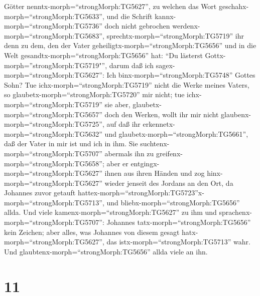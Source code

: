 Götter nenntx-morph=``strongMorph:TG5627'', zu welchen das Wort
geschahx-morph=``strongMorph:TG5633'', und die Schrift
kannx-morph=``strongMorph:TG5736'' doch nicht gebrochen
werdenx-morph=``strongMorph:TG5683'', 
sprechtx-morph=``strongMorph:TG5719'' ihr denn zu dem, den der Vater
geheiligtx-morph=``strongMorph:TG5656'' und in die Welt
gesandtx-morph=``strongMorph:TG5656'' hat: ``Du lästerst
Gottx-morph=''strongMorph:TG5719"'', darum daß ich
sagex-morph=``strongMorph:TG5627'': Ich
binx-morph=``strongMorph:TG5748'' Gottes Sohn?  Tue
ichx-morph=``strongMorph:TG5719'' nicht die Werke meines Vaters, so
glaubetx-morph=``strongMorph:TG5720'' mir nicht;  tue
ichx-morph=``strongMorph:TG5719'' sie aber,
glaubetx-morph=``strongMorph:TG5657'' doch den Werken, wollt ihr mir
nicht glaubenx-morph=``strongMorph:TG5725'', auf daß ihr
erkennetx-morph=``strongMorph:TG5632'' und
glaubetx-morph=``strongMorph:TG5661'', daß der Vater in mir ist und ich
in ihm.  Sie suchtenx-morph=``strongMorph:TG5707'' abermals
ihn zu greifenx-morph=``strongMorph:TG5658''; aber er
entgingx-morph=``strongMorph:TG5627'' ihnen aus ihren Händen
 und zog hinx-morph=``strongMorph:TG5627'' wieder jenseit
des Jordans an den Ort, da Johannes zuvor getauft
hattex-morph=``strongMorph:TG5723''x-morph=``strongMorph:TG5713'', und
bliebx-morph=``strongMorph:TG5656'' allda.  Und viele
kamenx-morph=``strongMorph:TG5627'' zu ihm und
sprachenx-morph=``strongMorph:TG5707'': Johannes
tatx-morph=``strongMorph:TG5656'' kein Zeichen; aber alles, was Johannes
von diesem gesagt hatx-morph=``strongMorph:TG5627'', das
istx-morph=``strongMorph:TG5713'' wahr.  Und
glaubtenx-morph=``strongMorph:TG5656'' allda viele an ihn.

\hypertarget{section-10}{%
\section{11}\label{section-10}}

